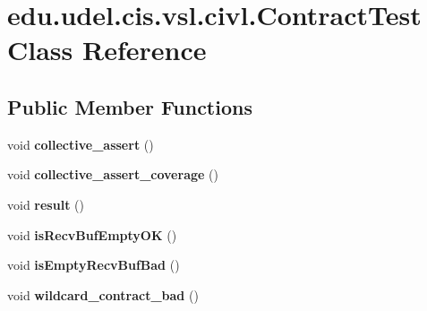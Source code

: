 \hypertarget{classedu_1_1udel_1_1cis_1_1vsl_1_1civl_1_1ContractTest}{}\section{edu.\+udel.\+cis.\+vsl.\+civl.\+Contract\+Test Class Reference}
\label{classedu_1_1udel_1_1cis_1_1vsl_1_1civl_1_1ContractTest}
\subsection*{Public Member Functions}
\begin{DoxyCompactItemize}
\item 
\hypertarget{classedu_1_1udel_1_1cis_1_1vsl_1_1civl_1_1ContractTest_a73e893633fb67ec3eaf71ec308e1bebf}{}void {\bfseries collective\+\_\+assert} ()\label{classedu_1_1udel_1_1cis_1_1vsl_1_1civl_1_1ContractTest_a73e893633fb67ec3eaf71ec308e1bebf}

\item 
\hypertarget{classedu_1_1udel_1_1cis_1_1vsl_1_1civl_1_1ContractTest_a934962ac4e2eaa8a3e5b78fc54e43644}{}void {\bfseries collective\+\_\+assert\+\_\+coverage} ()\label{classedu_1_1udel_1_1cis_1_1vsl_1_1civl_1_1ContractTest_a934962ac4e2eaa8a3e5b78fc54e43644}

\item 
\hypertarget{classedu_1_1udel_1_1cis_1_1vsl_1_1civl_1_1ContractTest_a75ea6cc943404a6f7dab8d796aecdbc6}{}void {\bfseries result} ()\label{classedu_1_1udel_1_1cis_1_1vsl_1_1civl_1_1ContractTest_a75ea6cc943404a6f7dab8d796aecdbc6}

\item 
\hypertarget{classedu_1_1udel_1_1cis_1_1vsl_1_1civl_1_1ContractTest_afc952d59562a16110d1abe8bc27fc7b5}{}void {\bfseries is\+Recv\+Buf\+Empty\+O\+K} ()\label{classedu_1_1udel_1_1cis_1_1vsl_1_1civl_1_1ContractTest_afc952d59562a16110d1abe8bc27fc7b5}

\item 
\hypertarget{classedu_1_1udel_1_1cis_1_1vsl_1_1civl_1_1ContractTest_a40c7b702bfb274e08710a4faa3ba30ac}{}void {\bfseries is\+Empty\+Recv\+Buf\+Bad} ()\label{classedu_1_1udel_1_1cis_1_1vsl_1_1civl_1_1ContractTest_a40c7b702bfb274e08710a4faa3ba30ac}

\item 
\hypertarget{classedu_1_1udel_1_1cis_1_1vsl_1_1civl_1_1ContractTest_a785c64d946bf8cb3feb65812320164a5}{}void {\bfseries wildcard\+\_\+contract\+\_\+bad} ()\label{classedu_1_1udel_1_1cis_1_1vsl_1_1civl_1_1ContractTest_a785c64d946bf8cb3feb65812320164a5}

\end{DoxyCompactItemize}
